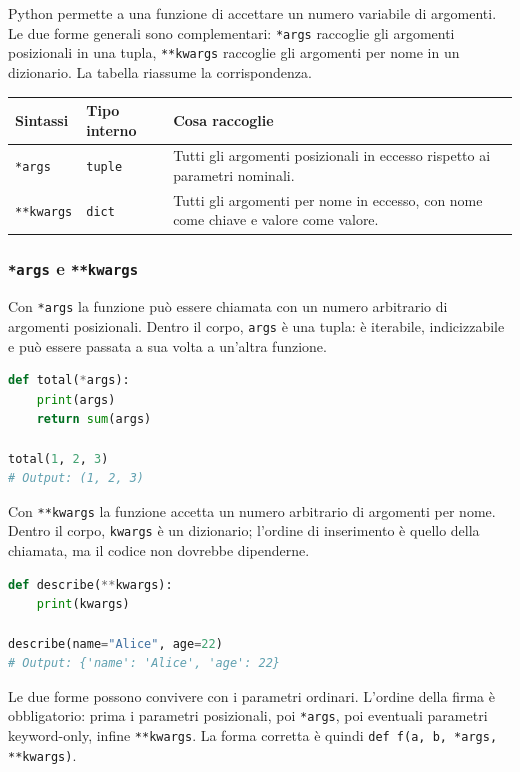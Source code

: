 \documentclass[12pt]{extarticle}
\begin{document}
\noindent Python permette a una funzione di accettare un numero variabile di argomenti. Le due forme generali sono complementari: \texttt{*args} raccoglie gli argomenti posizionali in una tupla, \texttt{**kwargs} raccoglie gli argomenti per nome in un dizionario. La tabella riassume la corrispondenza.

\begin{center}
\small
\begin{tabular}{p{3.0cm}p{4.2cm}p{7.0cm}}
    \toprule
    \textbf{Sintassi} & \textbf{Tipo interno} & \textbf{Cosa raccoglie} \\
    \midrule
    \texttt{*args} & \texttt{tuple} & Tutti gli argomenti posizionali in eccesso rispetto ai parametri nominali. \\
    \addlinespace
    \texttt{**kwargs} & \texttt{dict} & Tutti gli argomenti per nome in eccesso, con nome come chiave e valore come valore. \\
    \bottomrule
\end{tabular}
\end{center}

\subsubsection{\texttt{*args} e \texttt{**kwargs}}

\noindent Con \texttt{*args} la funzione può essere chiamata con un numero arbitrario di argomenti posizionali. Dentro il corpo, \texttt{args} è una tupla: è iterabile, indicizzabile e può essere passata a sua volta a un'altra funzione.

\begin{lstlisting}[language=Python]
def total(*args):
    print(args)
    return sum(args)

total(1, 2, 3)
# Output: (1, 2, 3)
\end{lstlisting}

\noindent Con \texttt{**kwargs} la funzione accetta un numero arbitrario di argomenti per nome. Dentro il corpo, \texttt{kwargs} è un dizionario; l'ordine di inserimento è quello della chiamata, ma il codice non dovrebbe dipenderne.

\begin{lstlisting}[language=Python]
def describe(**kwargs):
    print(kwargs)

describe(name="Alice", age=22)
# Output: {'name': 'Alice', 'age': 22}
\end{lstlisting}

\noindent Le due forme possono convivere con i parametri ordinari. L'ordine della firma è obbligatorio: prima i parametri posizionali, poi \texttt{*args}, poi eventuali parametri keyword-only, infine \texttt{**kwargs}. La forma corretta è quindi \texttt{def f(a, b, *args, **kwargs)}.
\end{document}
